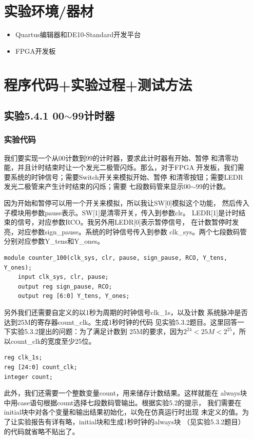 \documentclass[12pt,a4paper,UTF8]{article}
\begin{document}
\section{实验环境/器材}
\begin{itemize}
  \item Quartus编辑器和DE10-Standard开发平台
  \item FPGA开发板
\end{itemize}

\section{程序代码+实验过程+测试方法}
\subsection{实验5.4.1 00$\sim$99计时器}
\subsubsection{实验代码}
我们要实现一个从00计数到99的计时器，要求此计时器有开始、暂停
和清零功能，并且计时结束时让一个发光二极管闪烁。那么，对于FPGA
开发板，我们需要系统的时钟信号；需要Switch开关来模拟开始、暂停
和清零按钮；需要LEDR发光二极管来产生计时结束的闪烁；需要
七段数码管来显示00$\sim$99的计数。

因为开始和暂停可以用一个开关来模拟，所以我让SW[0]模拟这个功能，
然后传入子模块用参数pause表示。SW[1]是清零开关，传入到参数clr。
LEDR[1]是计时结束的信号，对应参数RCO。我另外用LEDR[0]表示暂停信号，
在计数暂停时发亮，对应参数sign\_pause。系统的时钟信号传入到参数
clk\_sys。两个七段数码管分别对应参数Y\_tens和Y\_ones。
\begin{lstlisting}[style=verilog-style]
module counter_100(clk_sys, clr, pause, sign_pause, RCO, Y_tens, Y_ones);
	input clk_sys, clr, pause;
	output reg sign_pause, RCO;
	output reg [6:0] Y_tens, Y_ones;
\end{lstlisting}

另外我们还需要自定义的以1秒为周期的时钟信号clk\_1s，以及计数
系统脉冲是否达到25M的寄存器count\_clk。生成1秒时钟的代码
见实验5.3.2题目。这里回答一下实验5.3.2提出的问题：为了满足计数到
25M的要求，因为$2^{24}<25M<2^{25}$，所以count\_clk的宽度至少25位。
\begin{lstlisting}[style=verilog-style]
reg clk_1s;
reg [24:0] count_clk; 
integer count;
\end{lstlisting}

此外，我们还需要一个整数变量count，用来储存计数结果。这样就能在
always块中用case语句根据count选择七段数码管输出。根据实验5.2的提示，
我们需要在initial块中对各个变量和输出结果初始化，以免在仿真运行时出现
未定义的值。为了让实验报告有详有略，initial块和生成1秒时钟的always块
（见实验5.3.2题目）的代码就省略不贴出了。
\end{document}
